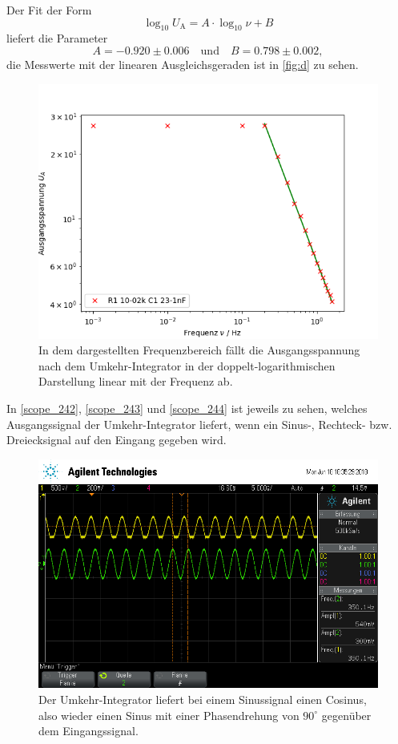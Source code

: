 Der Fit der Form
\begin{equation}
	\log_{10} U_\text{A} = A \cdot \log_{10} \nu + B
\end{equation}
liefert die Parameter
\begin{equation}
	A = -0.920 \pm 0.006 \quad \text{und} \quad B = 0.798 \pm 0.002,
\end{equation}
die Messwerte mit der linearen Ausgleichsgeraden ist in \autoref{fig:d} zu sehen.
\begin{figure}[h]
	\centering
	\includegraphics[width=\textwidth]{img/d.png}
	\caption{In dem dargestellten Frequenzbereich fällt die Ausgangsspannung nach dem Umkehr-Integrator in der doppelt-logarithmischen Darstellung linear mit der Frequenz ab.}
	\label{fig:d}
\end{figure}
In \autoref{scope_242}, \autoref{scope_243} und \autoref{scope_244} ist jeweils zu sehen, welches Ausgangssignal der Umkehr-Integrator liefert, wenn ein Sinus-, Rechteck- bzw. Dreiecksignal auf den Eingang gegeben wird.\begin{figure}[h]
	\centering
	\includegraphics[width=\textwidth]{usb/scope_242.png}
	\caption{Der Umkehr-Integrator liefert bei einem Sinussignal einen Cosinus, also wieder einen Sinus mit einer Phasendrehung von $90^\circ$ gegenüber dem Eingangssignal.}
	\label{scope_242}
\end{figure}
